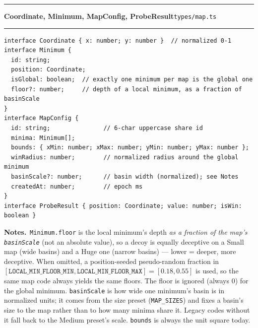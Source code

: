 \documentclass[11pt,a4paper]{report}
\newcommand{\srcfile}[1]{\texttt{\small #1}}   %
\newcommand{\ts}[1]{\texttt{#1}}               %
\newenvironment{apientry}[2]{%
  \par\medskip\noindent
  \begin{minipage}{\textwidth}
  \hrule\vspace{0.6ex}
  {\large\ttfamily\bfseries #1}\hfill{\footnotesize\srcfile{#2}}
  \vspace{0.4ex}\hrule\medskip
}{%
  \end{minipage}\par\medskip
}
\newcommand{\apifield}[1]{\par\smallskip\noindent\textbf{#1.}\ }
\begin{document}
\begin{apientry}{Coordinate, Minimum, MapConfig, ProbeResult}{types/map.ts}
\begin{lstlisting}
interface Coordinate { x: number; y: number }  // normalized 0-1
interface Minimum {
  id: string;
  position: Coordinate;
  isGlobal: boolean;  // exactly one minimum per map is the global one
  floor?: number;     // depth of a local minimum, as a fraction of basinScale
}
interface MapConfig {
  id: string;               // 6-char uppercase share id
  minima: Minimum[];
  bounds: { xMin: number; xMax: number; yMin: number; yMax: number };
  winRadius: number;        // normalized radius around the global minimum
  basinScale?: number;      // basin width (normalized); see Notes
  createdAt: number;        // epoch ms
}
interface ProbeResult { position: Coordinate; value: number; isWin: boolean }
\end{lstlisting}
\apifield{Notes}\ts{Minimum.floor} is the local minimum's depth
\emph{as a fraction of the map's \ts{basinScale}} (not an absolute value),
so a decoy is equally deceptive on a Small map (wide basins) and a Huge one
(narrow basins) --- lower = deeper, more deceptive. When omitted, a
position-seeded pseudo-random fraction in
$[\ts{LOCAL\_MIN\_FLOOR\_MIN}, \ts{LOCAL\_MIN\_FLOOR\_MAX}] = [0.18, 0.55]$
is used, so the same map code always yields the same floors. The floor is
ignored (always 0) for the global minimum. \ts{basinScale} is how wide one
minimum's basin is in normalized units; it comes from the size preset
(\ts{MAP\_SIZES}) and fixes a basin's size to the map rather than to how
many minima share it. Legacy codes without it fall back to the Medium
preset's scale. \ts{bounds} is always the unit square today.
\end{apientry}
\end{document}
